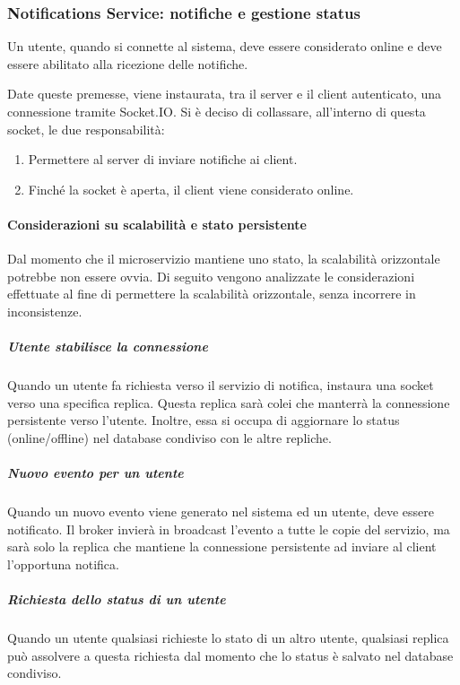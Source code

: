 %
%
%
\subsubsection{Notifications Service: notifiche e gestione status}

Un utente, quando si connette al sistema, deve essere considerato online e deve essere abilitato alla ricezione delle notifiche.

Date queste premesse, viene instaurata, tra il server e il client autenticato, una connessione tramite Socket.IO.
%
Si è deciso di collassare, all'interno di questa socket, le due responsabilità:

\begin{enumerate}
    \item Permettere al server di inviare notifiche ai client.

    \item Finché la socket è aperta, il client viene considerato online.
\end{enumerate}

%
%
%
\paragraph{Considerazioni su scalabilità e stato persistente}

Dal momento che il microservizio mantiene uno stato, la scalabilità orizzontale potrebbe non essere ovvia.
%
Di seguito vengono analizzate le considerazioni effettuate al fine di permettere la scalabilità orizzontale, senza incorrere in inconsistenze.

%
%
%
\subparagraph{Utente stabilisce la connessione} 

Quando un utente fa richiesta verso il servizio di notifica, instaura una socket verso una specifica replica.
%
Questa replica sarà colei che manterrà la connessione persistente verso l'utente.
%
Inoltre, essa si occupa di aggiornare lo status (online/offline) nel database condiviso con le altre repliche.

%
%
%
\subparagraph{Nuovo evento per un utente}

Quando un nuovo evento viene generato nel sistema ed un utente, deve essere notificato.
%
Il broker invierà in broadcast l'evento a tutte le copie del servizio, ma sarà solo la replica che mantiene la connessione persistente ad inviare al client l'opportuna notifica.

%
%
%
\subparagraph{Richiesta dello status di un utente}

Quando un utente qualsiasi richieste lo stato di un altro utente, qualsiasi replica può assolvere a questa richiesta dal momento che lo status è salvato nel database condiviso.

